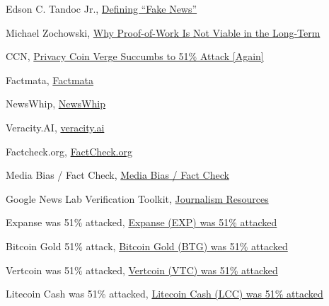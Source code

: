 \documentclass[target=mst,aauheader=]{thud}
\begin{document}

\begin{thebibliography}{99}

    Edson C. Tandoc Jr., \href{https://www.tandfonline.com/doi/abs/10.1080/21670811.2017.1360143}{Defining “Fake News”}

    Michael Zochowski, \href{https://medium.com/logos-network/why-proof-of-work-is-not-viable-in-the-long-term-dd96d2775e99}{Why Proof-of-Work Is Not Viable in the Long-Term}

    CCN, \href{https://www.ccn.com/privacy-coin-verge-succumbs-to-51-attack-again/}{Privacy Coin Verge Succumbs to 51\% Attack [Again]}

    Factmata, \href{https://factmata.com/}{Factmata}

    NewsWhip, \href{https://www.newswhip.com/}{NewsWhip}

    Veracity.AI, \href{https://veracityai.com/en/}{veracity.ai}

    Factcheck.org, \href{https://www.factcheck.org/}{FactCheck.org}

    Media Bias / Fact Check, \href{https://mediabiasfactcheck.com/}{Media Bias / Fact Check}

    Google News Lab Verification Toolkit, \href{https://newsinitiative.withgoogle.com/resources/journalism/}{Journalism Resources}

    Expanse was 51\% attacked, \href{https://gist.github.com/metalicjames/01222049f95f85df8c0eb253de54848b}{Expanse (EXP) was 51\% attacked}

    Bitcoin Gold 51\% attack, \href{https://gist.github.com/metalicjames/71321570a105940529e709651d0a9765}{Bitcoin Gold (BTG) was 51\% attacked}

    Vertcoin was 51\% attacked, \href{https://gist.github.com/metalicjames/f2acdb9ef448ec5298173b36c7c54133}{Vertcoin (VTC) was 51\% attacked}

    Litecoin Cash was 51\% attacked, \href{https://gist.github.com/metalicjames/82a49f8afa87334f929881e55ad4ffd7}{Litecoin Cash (LCC) was 51\% attacked}


\end{thebibliography}
\end{document}
